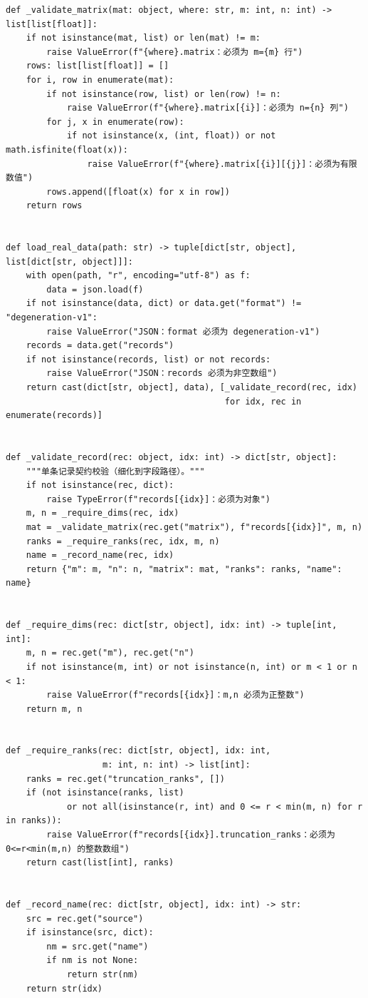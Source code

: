 \documentclass[UTF8,11pt,a4paper]{ctexart}
\theoremstyle{plain}
\theoremstyle{definition}
\theoremstyle{remark}
\begin{document}
\begin{Verbatim}[fontsize=\scriptsize,frame=single,breaklines=true,breakanywhere=true,breaksymbolleft={}]
def _validate_matrix(mat: object, where: str, m: int, n: int) -> list[list[float]]:
    if not isinstance(mat, list) or len(mat) != m:
        raise ValueError(f"{where}.matrix：必须为 m={m} 行")
    rows: list[list[float]] = []
    for i, row in enumerate(mat):
        if not isinstance(row, list) or len(row) != n:
            raise ValueError(f"{where}.matrix[{i}]：必须为 n={n} 列")
        for j, x in enumerate(row):
            if not isinstance(x, (int, float)) or not math.isfinite(float(x)):
                raise ValueError(f"{where}.matrix[{i}][{j}]：必须为有限数值")
        rows.append([float(x) for x in row])
    return rows


def load_real_data(path: str) -> tuple[dict[str, object], list[dict[str, object]]]:
    with open(path, "r", encoding="utf-8") as f:
        data = json.load(f)
    if not isinstance(data, dict) or data.get("format") != "degeneration-v1":
        raise ValueError("JSON：format 必须为 degeneration-v1")
    records = data.get("records")
    if not isinstance(records, list) or not records:
        raise ValueError("JSON：records 必须为非空数组")
    return cast(dict[str, object], data), [_validate_record(rec, idx)
                                           for idx, rec in enumerate(records)]


def _validate_record(rec: object, idx: int) -> dict[str, object]:
    """单条记录契约校验（细化到字段路径）。"""
    if not isinstance(rec, dict):
        raise TypeError(f"records[{idx}]：必须为对象")
    m, n = _require_dims(rec, idx)
    mat = _validate_matrix(rec.get("matrix"), f"records[{idx}]", m, n)
    ranks = _require_ranks(rec, idx, m, n)
    name = _record_name(rec, idx)
    return {"m": m, "n": n, "matrix": mat, "ranks": ranks, "name": name}


def _require_dims(rec: dict[str, object], idx: int) -> tuple[int, int]:
    m, n = rec.get("m"), rec.get("n")
    if not isinstance(m, int) or not isinstance(n, int) or m < 1 or n < 1:
        raise ValueError(f"records[{idx}]：m,n 必须为正整数")
    return m, n


def _require_ranks(rec: dict[str, object], idx: int,
                   m: int, n: int) -> list[int]:
    ranks = rec.get("truncation_ranks", [])
    if (not isinstance(ranks, list)
            or not all(isinstance(r, int) and 0 <= r < min(m, n) for r in ranks)):
        raise ValueError(f"records[{idx}].truncation_ranks：必须为 0<=r<min(m,n) 的整数数组")
    return cast(list[int], ranks)


def _record_name(rec: dict[str, object], idx: int) -> str:
    src = rec.get("source")
    if isinstance(src, dict):
        nm = src.get("name")
        if nm is not None:
            return str(nm)
    return str(idx)



\end{Verbatim}
\end{document}
